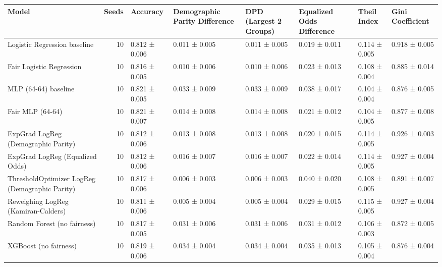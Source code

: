 \begin{tabular}{lrllllll}
\toprule
Model & Seeds & Accuracy & Demographic Parity Difference & DPD (Largest 2 Groups) & Equalized Odds Difference & Theil Index & Gini Coefficient \\
\midrule
Logistic Regression baseline & 10 & 0.812 ± 0.006 & 0.011 ± 0.005 & 0.011 ± 0.005 & 0.019 ± 0.011 & 0.114 ± 0.005 & 0.918 ± 0.005 \\
Fair Logistic Regression & 10 & 0.816 ± 0.005 & 0.010 ± 0.006 & 0.010 ± 0.006 & 0.023 ± 0.013 & 0.108 ± 0.004 & 0.885 ± 0.014 \\
MLP (64-64) baseline & 10 & 0.821 ± 0.005 & 0.033 ± 0.009 & 0.033 ± 0.009 & 0.038 ± 0.017 & 0.104 ± 0.004 & 0.876 ± 0.005 \\
Fair MLP (64-64) & 10 & 0.821 ± 0.007 & 0.014 ± 0.008 & 0.014 ± 0.008 & 0.021 ± 0.012 & 0.104 ± 0.005 & 0.877 ± 0.008 \\
ExpGrad LogReg (Demographic Parity) & 10 & 0.812 ± 0.006 & 0.013 ± 0.008 & 0.013 ± 0.008 & 0.020 ± 0.015 & 0.114 ± 0.005 & 0.926 ± 0.003 \\
ExpGrad LogReg (Equalized Odds) & 10 & 0.812 ± 0.006 & 0.016 ± 0.007 & 0.016 ± 0.007 & 0.022 ± 0.014 & 0.114 ± 0.005 & 0.927 ± 0.004 \\
ThresholdOptimizer LogReg (Demographic Parity) & 10 & 0.817 ± 0.006 & 0.006 ± 0.003 & 0.006 ± 0.003 & 0.040 ± 0.020 & 0.108 ± 0.005 & 0.891 ± 0.007 \\
Reweighing LogReg (Kamiran-Calders) & 10 & 0.811 ± 0.006 & 0.005 ± 0.004 & 0.005 ± 0.004 & 0.029 ± 0.015 & 0.115 ± 0.005 & 0.927 ± 0.004 \\
Random Forest (no fairness) & 10 & 0.817 ± 0.005 & 0.031 ± 0.006 & 0.031 ± 0.006 & 0.031 ± 0.012 & 0.106 ± 0.003 & 0.872 ± 0.005 \\
XGBoost (no fairness) & 10 & 0.819 ± 0.006 & 0.034 ± 0.004 & 0.034 ± 0.004 & 0.035 ± 0.013 & 0.105 ± 0.004 & 0.876 ± 0.004 \\
\bottomrule
\end{tabular}
